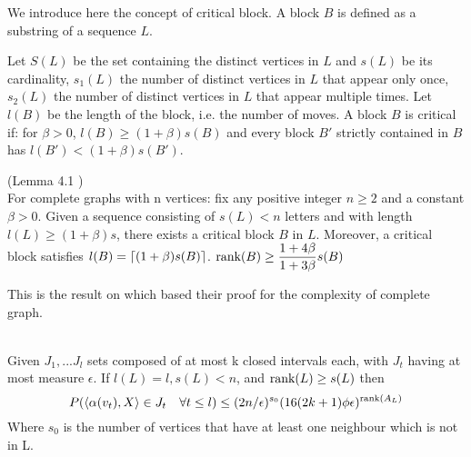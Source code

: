 We introduce here the concept of critical block. A block $B$ is defined as a substring of a sequence $L$.

Let $S(L)$ be the set containing the distinct vertices in $L$ and $s(L)$ be its cardinality, $s_1(L)$ the number of distinct vertices in $L$ that appear only once, $s_2(L)$ the number of distinct vertices in $L$ that appear multiple times. Let $l(B)$ be the length of the block, i.e. the number of moves.
A block $B$ is critical if: for $\beta > 0$, $l(B) \geq (1 + \beta)s(B)$ and every block $B'$ strictly contained in $B$ has $l(B') < (1+\beta)s(B')$.

\begin{lemma}
\label{critical}
(Lemma 4.1 \cite{angel2016local}) \\
For complete graphs with n vertices: fix any positive integer $n \geq 2$ and a constant $\beta > 0$. Given a sequence consisting of $s(L) < n$ letters and with length $l(L) \geq (1 +\beta)s$, there exists a critical block $B$ in $L$. Moreover, a critical block satisfies $l(B) = \lceil(1 + \beta)s(B)\rceil$.
$\text{rank}(B) \geq \dfrac{1+4\beta}{1 + 3\beta}s(B)$
\end{lemma} 

This is the result on which \cite{angel2016local} based their proof for the complexity of complete graph.

\begin{lemma} \leavevmode \\
\label{lem::boundN}
Given $J_1, ... J_l$ sets composed of at most k closed intervals each, with $J_t$ having at most measure $\epsilon$.
If $l(L) = l, s(L) < n$, and $\text{rank}(L) \geq s(L)$ then \\
\begin{equation*}
P(\langle \alpha(v_t), X \rangle \in J_t \quad \forall t\leq l)  \leq (2n/\epsilon)^{s_0}(16(2k+1)\phi\epsilon)^{\text{rank}(A_L)}
\end{equation*}
Where $s_0$ is the number of vertices that have at least one neighbour which is not in L. 
\end{lemma}

